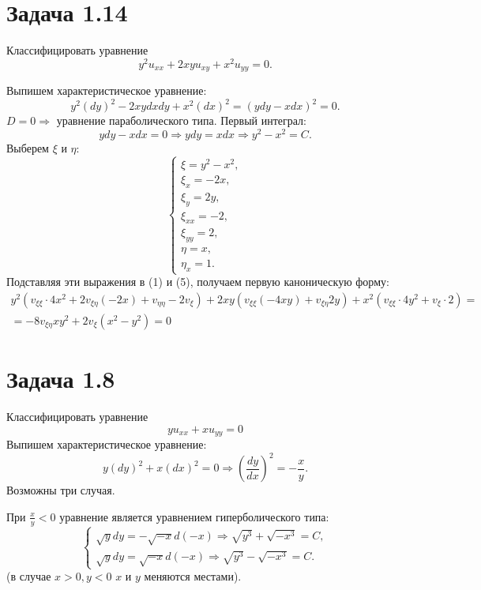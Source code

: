 \documentclass[11pt]{article}
\begin{document}
\section{Задача 1.14}
\label{sec:orgb3c8f19}
Классифицировать уравнение
\begin{equation}
y^2u_{xx} + 2xyu_{xy} + x^2u_{yy} = 0.
\end{equation}

Выпишем характеристическое уравнение:
\begin{equation}
y^2(dy)^2 - 2xydxdy + x^2(dx)^2 = (ydy - xdx)^2 = 0.
\end{equation}
$D = 0 \Rightarrow$ уравнение параболического типа. Первый интеграл:
\begin{equation*}
ydy - xdx = 0 \Rightarrow ydy = xdx \Rightarrow y^2 - x^2 = C.
\end{equation*}
Выберем $\xi$ и $\eta$:
\begin{equation}
\begin{cases}
\xi = y^2 - x^2, \\
\xi_x = -2x, \\
\xi_y = 2y, \\
\xi_{xx} = -2, \\
\xi_{yy} = 2, \\
\eta = x, \\
\eta_x = 1.
\end{cases}
\end{equation}
Подставляя эти выражения в (1) и (5), получаем первую каноническую форму:
\begin{multline}
y^2(v_{\xi\xi}\cdot4x^2 + 2v_{\xi\eta}(-2x) + v_{\eta\eta} - 2v_{\xi}) + 2xy(v_{\xi\xi}(-4xy) +
v_{\xi\eta}2y) + x^2(v_{\xi\xi}\cdot4y^2 + v_{\xi}\cdot2) = \\
= -8v_{\xi\eta}xy^2 + 2v_{\xi}(x^2 - y^2) = 0
\end{multline}

\section{Задача 1.8}
\label{sec:org547cbce}
Классифицировать уравнение
\begin{equation}
yu_{xx} + xu_{yy} = 0
\end{equation}
Выпишем характеристическое уравнение:
\begin{equation}
y(dy)^2 + x(dx)^2 = 0 \Rightarrow \left(\frac{dy}{dx}\right)^2 = -\frac{x}y.
\end{equation}
Возможны три случая.

При $\frac{x}y < 0$ уравнение является уравнением гиперболического типа:
\begin{equation*}
\begin{cases}
\sqrt{y}dy = -\sqrt{-x}d(-x) \Rightarrow \sqrt{y^3} + \sqrt{-x^3} = C, \\
\sqrt{y}dy = \sqrt{-x}d(-x) \Rightarrow \sqrt{y^3} - \sqrt{-x^3} = C.
\end{cases}
\end{equation*}
(в случае $x > 0, y < 0$ $x$ и $y$ меняются местами).
\end{document}
